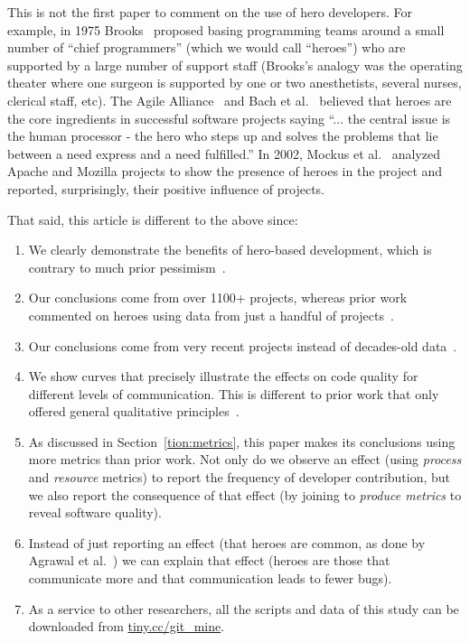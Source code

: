 \documentclass[sigconf,review]{acmart}
\newcommand{\be}{\begin{enumerate}}
\newcommand{\ee}{\end{enumerate}}
\begin{document}
This is not the first paper to comment on the use of hero developers. 
For example,
in 1975  Brooks~\cite{Brooks:1975} proposed
basing programming teams around a small number of ``chief programmers'' (which we would call ``heroes'')  who are supported by a large number of support staff
(Brooks's analogy was the operating theater where one surgeon is supported by one or two anesthetists, several nurses,
clerical staff, etc). 
The Agile Alliance~\cite{cockburn2006agile} and Bach et al.~\cite{bach1995enough} believed that heroes are the core ingredients in successful software projects saying ``... the central issue is the human processor - the hero  who steps up and solves the problems that lie between a need express and a need fulfilled.'' 
In 2002, Mockus et al.~\cite{mockus2002two} analyzed Apache and Mozilla projects to show the presence of heroes in the project and
reported, surprisingly,  their positive influence of projects. 
  

That said, this article is different to the above since:

\be
\item
We clearly demonstrate the benefits of hero-based development, which is contrary to much prior pessimism~\cite{bier2011online,boehm2006view,hislop2002integrating,morcovcomplex,wood2005multiview,fitzgerald2003making}.
\item
Our conclusions come from   over 1100+ projects, whereas 
prior work   commented
on heroes using data 
from just a handful of projects~\cite{544352,LI1993111,Zimmermann:2009:CDP:1595696.1595713,935855,841025,Bird:2011:DTM:2025113.2025119,Pamela,bell2,Kumar2017,jiarpakdee2018impact,8595100}.
\item
Our conclusions come from very recent projects instead of decades-old data~\cite{Jayanthi2018,Gupta2017,jiarpakdee2018impact,kemerer2009impact,Pamela,fengzhang}.
\item
We   show curves that precisely illustrate the effects on code quality
for different levels of communication. This is different to prior
work that only offered general qualitative principles~\cite{wolf2009predicting,de2004sometimes,grinter1999geography,herbsleb1999splitting,cataldo2013coordination,cataldo2007coordination}.
\item
As discussed in Section~\ref{tion:metrics}, this
paper makes its conclusions using more metrics
than  prior work.   Not only do we observe an effect (using
{\em process} and {\em resource} metrics) to report the  frequency of
developer contribution, but we also report the consequence of that effect
(by joining to {\em produce metrics} to reveal software quality).
\item
Instead of just  reporting an effect (that heroes are common, as done by
 Agrawal et al.~\cite{Agrawal_2018}) we can explain that effect
 (heroes are those that communicate more and that communication
 leads to fewer bugs).
\item
As a service to other researchers, all  the  scripts and data of this study
can be downloaded from \href{http://tiny.cc/git_mine}{tiny.cc/git\_mine}.
\ee
\end{document}
